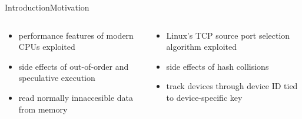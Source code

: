 \documentclass[aspectratio=169, hyperref={colorlinks=true, allcolors=SecondaryColor}, c]{beamer}
\begin{document}
\begin{frame}[fragile]{Introduction}{Motivation}
\begin{columns}
	\end{columns}
	\begin{columns}
		\begin{column}[t]{0.5\textwidth}
			\begin{itemize}
				\item performance features of modern CPUs \alert{exploited}
				\item \alert{side effects} of out-of-order and speculative execution
				\item read normally innaccesible data from memory
			\end{itemize}
		\end{column}
		\begin{column}[t]{0.5\textwidth}
			\begin{itemize}
				\item Linux’s TCP source port selection algorithm \alert{exploited}
				\item \alert{side effects} of hash collisions
				\item track devices through device ID tied to device-specific key
			\end{itemize}
		\end{column}
	\end{columns}
\end{frame}
\end{document}

